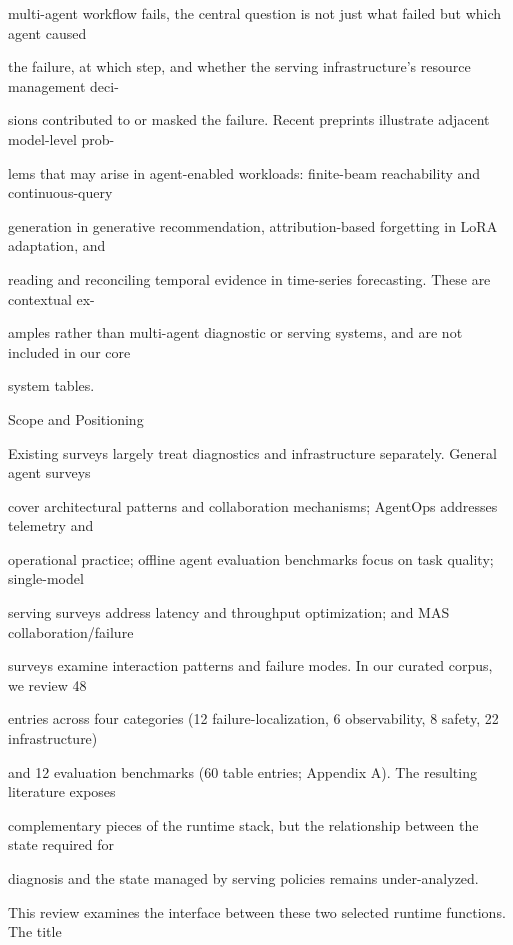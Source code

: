 \begin{flushleft}
\noindent multi-agent workflow fails, the central question is not just what failed but which agent caused\par
\noindent the failure, at which step, and whether the serving infrastructure’s resource management deci-\par
\noindent sions contributed to or masked the failure. Recent preprints illustrate adjacent model-level prob-\par
\noindent lems that may arise in agent-enabled workloads: finite-beam reachability and continuous-query\par
\noindent generation in generative recommendation, attribution-based forgetting in LoRA adaptation, and\par
\noindent reading and reconciling temporal evidence in time-series forecasting. These are contextual ex-\par
\noindent amples rather than multi-agent diagnostic or serving systems, and are not included in our core\par
\noindent system tables.\par
\par\smallskip
{} Scope and Positioning\par
\noindent Existing surveys largely treat diagnostics and infrastructure separately. General agent surveys\par
\noindent cover architectural patterns and collaboration mechanisms; AgentOps addresses telemetry and\par
\noindent operational practice; offline agent evaluation benchmarks focus on task quality; single-model\par
\noindent serving surveys address latency and throughput optimization; and MAS collaboration/failure\par
\noindent surveys examine interaction patterns and failure modes. In our curated corpus, we review 48\par
\noindent entries across four categories (12 failure-localization, 6 observability, 8 safety, 22 infrastructure)\par
\noindent and 12 evaluation benchmarks (60 table entries; Appendix A). The resulting literature exposes\par
\noindent complementary pieces of the runtime stack, but the relationship between the state required for\par
\noindent diagnosis and the state managed by serving policies remains under-analyzed.\par
\noindent  This review examines the interface between these two selected runtime functions. The title\par

\end{flushleft}

